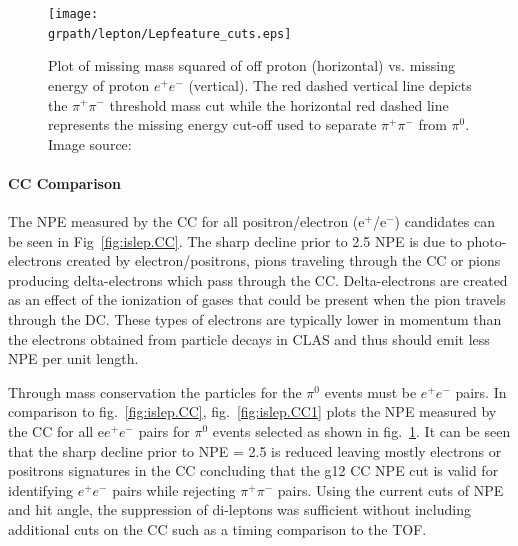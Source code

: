 	
\begin{figure}[h!]\begin{center}
			\texttt{[image: \\grpath/lepton/Lepfeature\_cuts.eps]}
			\caption[Cuts Applied to Isolate $\pi^0$ and $\pi^+\pi^-$ for PID Validation]{\label{fig:islep.cuts}Plot of missing mass squared of off proton (horizontal) vs. missing energy of proton $e^+e^-$ (vertical). The red dashed vertical line depicts the $\pi^+\pi^-$ threshold mass cut while the horizontal red dashed line represents the missing energy cut-off used to separate $\pi^+\pi^-$ from $\pi^0$. Image source:~\cite{thesiskunkel,g12note}}
\end{center}\end{figure}
\FloatBarrier
\paragraph{\label{sec:data.lepton.cc}CC Comparison}

The NPE measured by the CC for all positron/electron (e$^+$/e$^-$) candidates can be seen in Fig~\ref{fig:islep.CC}. The sharp decline prior to 2.5 NPE is due to photo-electrons created by electron/positrons, pions traveling through the CC or pions producing delta-electrons which pass through the CC. Delta-electrons are created as an effect of the ionization of gases that could be present when the pion travels through the DC. These types of electrons are typically lower in momentum than the electrons obtained from particle decays in CLAS and thus should emit less NPE per unit length.

Through mass conservation the particles for the $\pi^0$ events must be $e^+e^-$ pairs. In comparison to fig.~\ref{fig:islep.CC}, fig.~\ref{fig:islep.CC1} plots the NPE measured by the CC for all e$e^+e^-$ pairs for $\pi^0$ events selected as shown in fig.~\ref{fig:islep.cuts}. It can be seen that the sharp decline prior to NPE = 2.5 is reduced leaving mostly electrons or positrons signatures in the CC concluding that the g12 CC NPE cut is valid for identifying $e^+e^-$ pairs while rejecting $\pi^+\pi^-$ pairs.
Using the current cuts of NPE and hit angle, the suppression of di-leptons was sufficient without including additional cuts on the CC such as a timing comparison to the TOF.

